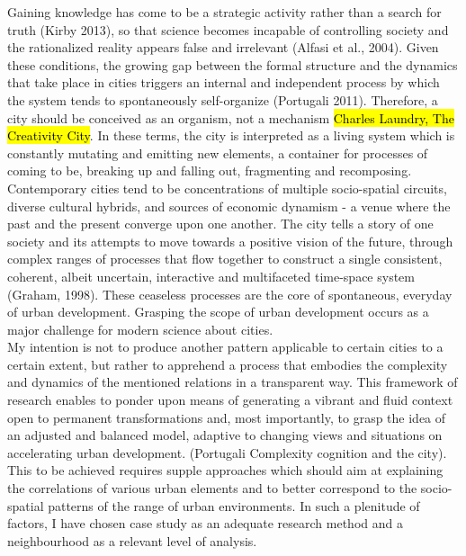 \documentclass[11pt]{report}
\begin{document}
Gaining knowledge has come to be a strategic activity rather than a search for truth (Kirby 2013), so that science becomes incapable of controlling society and the rationalized reality appears false and irrelevant (Alfasi et al., 2004). Given these conditions, the growing gap between the formal structure and the dynamics that take place in cities triggers an internal and independent process by which the system tends to spontaneously self-organize (Portugali 2011). Therefore, a city should be conceived as an organism, not a mechanism \hl{Charles Laundry, The Creativity City}. In these terms, the city is interpreted as a living system which is constantly mutating and emitting new elements, a container for processes of coming to be, breaking up and falling out, fragmenting and recomposing. Contemporary cities tend to be concentrations of multiple socio-spatial circuits, diverse cultural hybrids, and sources of economic dynamism - a venue where the past and the present converge upon one another. The city tells a story of one society and its attempts to move towards a positive vision of the future, through complex ranges of processes that flow together to construct a single consistent, coherent, albeit uncertain, interactive and multifaceted time-space system (Graham, 1998). These ceaseless processes are the core of spontaneous, everyday of urban development. Grasping the scope of urban development occurs as a major challenge for modern science about cities.
\\
My intention is not to produce another pattern applicable to certain cities to a certain extent, but rather to apprehend a process that embodies the complexity and dynamics of the mentioned relations in a transparent way.  This framework of research enables to ponder upon means of generating a vibrant and fluid context open to permanent transformations and, most importantly, to grasp the idea of an adjusted and balanced model, adaptive to changing views and situations on accelerating urban development. (Portugali Complexity cognition and the city). This to be achieved requires supple approaches which should aim at explaining the correlations of various urban elements and to better correspond to the socio-spatial patterns of the range of urban environments. In such a plenitude of factors, I have chosen case study as an adequate research method and a neighbourhood as a relevant level of analysis.
\\
\end{document}
